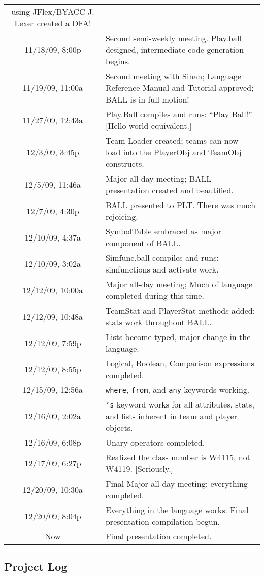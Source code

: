 \begin{center}
\begin{supertabular}{|c|p{5in}|}
using JFlex/BYACC-J. Lexer created a DFA!\\
11/18/09, 8:00p & Second semi-weekly meeting. Play.ball designed,
intermediate code generation begins.\\
11/19/09, 11:00a & Second meeting with Sinan; Language Reference
Manual and Tutorial approved; BALL is in full motion!\\
11/27/09, 12:43a & Play.Ball compiles and runs: ``Play Ball!'' [Hello
  world equivalent.]\\
12/3/09, 3:45p & Team Loader created; teams can now load into the
PlayerObj and TeamObj constructs.\\
12/5/09, 11:46a & Major all-day meeting; BALL presentation created and
beautified.\\
12/7/09, 4:30p & BALL presented to PLT. There was much rejoicing.\\
12/10/09, 4:37a & SymbolTable embraced as major component of BALL.\\
12/10/09, 3:02a & Simfunc.ball compiles and runs: simfunctions and
activate work.\\
12/12/09, 10:00a & Major all-day meeting; Much of language completed
during this time.\\
12/12/09, 10:48a & TeamStat and PlayerStat methods added: stats work
throughout BALL.\\
12/12/09, 7:59p & Lists become typed, major change in the language.\\
12/12/09, 8:55p & Logical, Boolean, Comparison expressions completed.\\
12/15/09, 12:56a & \texttt{where}, \texttt{from}, and \texttt{any} keywords working.\\
12/16/09, 2:02a & \texttt{'s} keyword works for all attributes, stats, and
lists inherent in team and player objects.\\
12/16/09, 6:08p & Unary operators completed.\\
12/17/09, 6:27p & Realized the class number is W4115, not
W4119. [Seriously.]\\
12/20/09, 10:30a & Final Major all-day meeting: everything completed.\\
12/20/09, 8:04p & Everything in the language works. Final presentation
compilation begun.\\
Now & Final presentation completed.\\

\end{supertabular}

\normalsize
\end{center}

\pagebreak
\subsection{Project Log}


